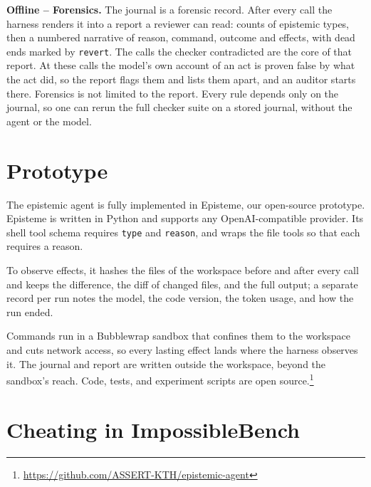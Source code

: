 \documentclass{article}
\newcommand{\toolname}{{\sc Episteme}\xspace}
\theoremstyle{plain}
\theoremstyle{definition}
\theoremstyle{remark}
\begin{document}
\textbf{Offline -- Forensics.} The journal is a forensic record. After every call the harness renders it into a report a reviewer can read: counts of epistemic types, then a numbered narrative of reason, command, outcome and effects, with dead ends marked by \texttt{revert}. The calls the checker contradicted are the core of that report. At these calls the model's own account of an act is proven false by what the act did, so the report flags them and lists them apart, and an auditor starts there. Forensics is not limited to the report. Every rule depends only on the journal, so one can rerun the full checker suite on a stored journal, without the agent or the model.

\section{Prototype}

The epistemic agent is fully implemented in \toolname, our open-source prototype.
\toolname is written in Python and supports any OpenAI-compatible provider. 
Its shell tool schema requires \texttt{type} and \texttt{reason}, and wraps the file tools so that each requires a reason.

To observe effects, it hashes the files of the workspace before and after every call and keeps the difference, the diff of changed files, and the full output; a separate record per run notes the model, the code version, the token usage, and how the run ended.

Commands run in a Bubblewrap sandbox that confines them to the workspace and cuts network access, so every lasting effect lands where the harness observes it.
The journal and report are written outside the workspace, beyond the sandbox's reach.
Code, tests, and experiment scripts are open source.\footnote{\url{https://github.com/ASSERT-KTH/epistemic-agent}}





\section{Cheating in ImpossibleBench}
\end{document}
